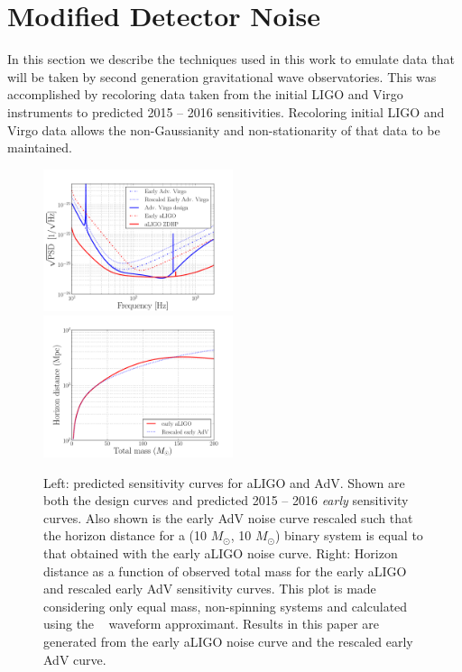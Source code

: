 \section{Modified Detector Noise}
\label{sec:noise}

In this section we describe the techniques used in this work to emulate data 
that will be taken by second generation gravitational wave observatories. This 
was accomplished by recoloring data taken from the initial LIGO and Virgo 
instruments to predicted 2015 -- 2016 sensitivities. Recoloring initial LIGO 
and 
Virgo data allows the non-Gaussianity and non-stationarity of that data to be 
maintained.

\begin{figure}
\centering
\includegraphics[width=0.495\textwidth]
{papers/mdc2013_submission/figure2A}
\includegraphics[width=0.495\textwidth]
{papers/mdc2013_submission/figure2B}
\caption{\label{fig:NOISE_design_spectra}
Left: predicted sensitivity curves for aLIGO and
AdV. Shown are both the design curves and predicted 2015 -- 2016
\emph{early} sensitivity curves. Also shown is the early AdV noise curve 
rescaled such that the horizon distance for a (10 $M_{\odot}$, 10 $M_{\odot}$) 
binary system is equal to that obtained with the early aLIGO noise 
curve. Right: Horizon distance as a function of observed total mass for the 
early aLIGO and rescaled early AdV sensitivity curves. This plot is 
made considering only equal mass, non-spinning systems and calculated using the 
\eob ~\cite{Pan:2011gk} waveform approximant. Results in this paper are 
generated from the early aLIGO noise curve and the rescaled early AdV curve.}
\end{figure}

